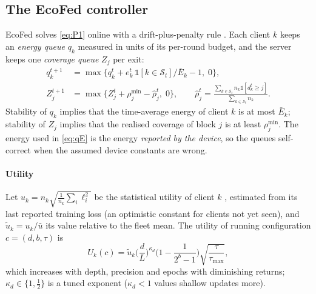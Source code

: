 \subsection{The EcoFed controller}\label{sec:controller}
EcoFed solves \eqref{eq:P1} online with a drift-plus-penalty rule \citep{neely2010stochastic}. Each client $k$ keeps an \emph{energy queue} $q_k$ measured in units of its per-round budget, and the server keeps one \emph{coverage queue} $Z_j$ per exit:
\begin{align}
q_k^{t+1}&=\max\{q_k^{t}+e_k^t\,\mathbb 1[k\in\mathcal S_t]/\bar E_k-1,\;0\},\label{eq:qE}\\
Z_j^{t+1}&=\max\{Z_j^{t}+\rho^{\min}_j-\hat\rho_j^{t},\;0\},\qquad \hat\rho_j^{t}=\frac{\sum_{k\in\mathcal S_t}n_k\mathbb 1[d_k^t\ge j]}{\sum_{k\in\mathcal S_t}n_k}.\label{eq:qZ}
\end{align}
Stability of $q_k$ implies that the time-average energy of client $k$ is at most $\bar E_k$; stability of $Z_j$ implies that the realised coverage of block $j$ is at least $\rho_j^{\min}$. The energy used in \eqref{eq:qE} is the energy \emph{reported by the device}, so the queues self-correct when the assumed device constants are wrong.

\paragraph{Utility}
Let $u_k=n_k\sqrt{\frac1{n_k}\sum_i\ell_i^2}$ be the statistical utility of client $k$ \citep{lai2021oort}, estimated from its last reported training loss (an optimistic constant for clients not yet seen), and $\tilde u_k=u_k/\bar u$ its value relative to the fleet mean. The utility of running configuration $c=(d,b,\tau)$ is
\begin{equation}\label{eq:utility}
U_k(c)=\tilde u_k\Big(\frac dL\Big)^{\kappa_d}\Big(1-\frac1{2^{b}-1}\Big)\sqrt{\frac{\tau}{\tau_{\max}}} ,
\end{equation}
which increases with depth, precision and epochs with diminishing returns; $\kappa_d\in\{1,\tfrac12\}$ is a tuned exponent ($\kappa_d<1$ values shallow updates more).

